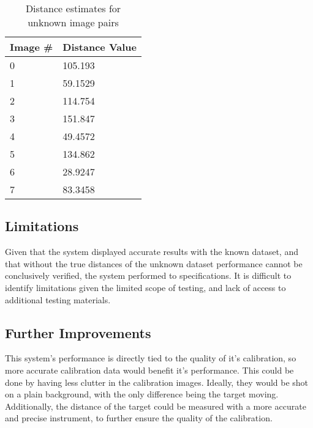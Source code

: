 \documentclass[conference]{IEEEtran}
\begin{document}
\begin{table}[]
\caption{Distance estimates for unknown image pairs}
\label{tab:t4_guesses}
\begin{tabular}{|l|l|}
\hline
\multicolumn{1}{|l|}{\textbf{Image \#}} & \textbf{Distance Value} \\	\hline
0                                       & 105.193                 \\	\hline
1                                       & 59.1529                 \\	\hline
2                                       & 114.754                 \\	\hline
3                                       & 151.847                 \\	\hline
4                                       & 49.4572                 \\	\hline
5                                       & 134.862                 \\	\hline
6                                       & 28.9247                 \\	\hline
7                                       & 83.3458                 \\	\hline
\end{tabular}
\end{table}

\subsection{Limitations}
Given that the system displayed accurate results with the known dataset, and that without the true distances of the unknown dataset performance cannot be conclusively verified, the system performed to specifications. It is difficult to identify limitations given the limited scope of testing, and lack of access to additional testing materials.

\subsection{Further Improvements} \label{sec:further1}
 This system's performance is directly tied to the quality of it's calibration, so more accurate calibration data would benefit it's performance. This could be done by having less clutter in the calibration images. Ideally, they would be shot on a plain background, with the only difference being the target moving. Additionally, the distance of the target could be measured with a more accurate and precise instrument, to further ensure the quality of the calibration.
 
\end{document}
